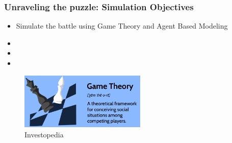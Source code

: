 \documentclass{beamer}
\begin{document}
\begin{frame}
  \frametitle{Unraveling the puzzle: Simulation Objectives}
  \begin{itemize}
    \item{Simulate the battle using Game Theory and Agent Based Modeling}
    \item{}
    \item{}
    \item{}
  \end{itemize}
  \begin{figure}
    \centering
      \includegraphics[width=6cm]{GameTheoryImage}
      \caption{Investopedia}
      \label{fig:Game_Theory}
    \centering
  \end{figure}
\end{frame}  

\begin{frame}

\end{frame}

\begin{frame}

\end{frame}

\begin{frame}

\end{frame}

\begin{frame}

\end{frame}

\begin{frame}

\end{frame}
\end{document}
